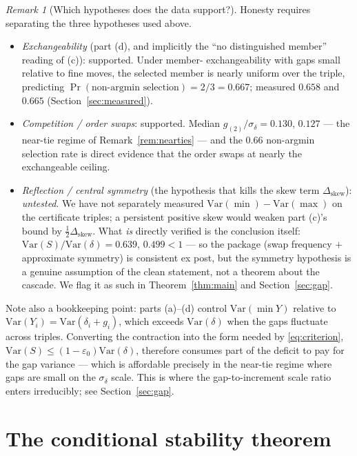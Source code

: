 \documentclass[11pt]{article}
\theoremstyle{definition}
\theoremstyle{remark}
\newtheorem{remark}[theorem]{Remark}
\newcommand{\Var}{\mathrm{Var}}
\newcommand{\dl}{\delta}
\begin{document}
\begin{remark}[Which hypotheses does the data support?]
\label{rem:hypotheses}
Honesty requires separating the three hypotheses used above.
\begin{itemize}
\item \emph{Exchangeability} (part (d), and implicitly the ``no
distinguished member'' reading of (c)): supported. Under member-\linebreak
exchangeability with gaps small relative to fine moves, the selected
member is nearly uniform over the triple, predicting
$\Pr(\text{non-argmin selection}) = 2/3 = 0.667$; measured $0.658$ and
$0.665$ (Section~\ref{sec:measured}).
\item \emph{Competition / order swaps}: supported. Median
$g_{(2)}/\sigma_\dl = 0.130$, $0.127$ --- the near-tie regime of
Remark~\ref{rem:nearties} --- and the $0.66$ non-argmin selection rate
is direct evidence that the order swaps at nearly the exchangeable
ceiling.
\item \emph{Reflection / central symmetry} (the hypothesis that kills
the skew term $\Delta_{\mathrm{skew}}$): \emph{untested}. We have not
separately measured $\Var(\min) - \Var(\max)$ on the certificate
triples; a persistent positive skew would weaken part (c)'s bound by
$\tfrac12\Delta_{\mathrm{skew}}$. What \emph{is} directly verified is
the conclusion itself: $\Var(S)/\Var(\dl) = 0.639$, $0.499 < 1$ --- so
the package (swap frequency $+$ approximate symmetry) is consistent ex
post, but the symmetry hypothesis is a genuine assumption of the clean
statement, not a theorem about the cascade. We flag it as such in
Theorem~\ref{thm:main} and Section~\ref{sec:gap}.
\end{itemize}
Note also a bookkeeping point: parts (a)--(d) control $\Var(\min Y)$
relative to $\Var(Y_i) = \Var(\dl_i + g_i)$, which exceeds $\Var(\dl)$
when the gaps fluctuate across triples. Converting the contraction into
the form needed by \eqref{eq:criterion}, $\Var(S) \leq (1 -
\varepsilon_0)\Var(\dl)$, therefore consumes part of the deficit to pay
for the gap variance --- which is affordable precisely in the near-tie
regime where gaps are small on the $\sigma_\dl$ scale. This is where the
gap-to-increment scale ratio enters irreducibly; see
Section~\ref{sec:gap}.
\end{remark}

\section{The conditional stability theorem}
\label{sec:main}
\end{document}
